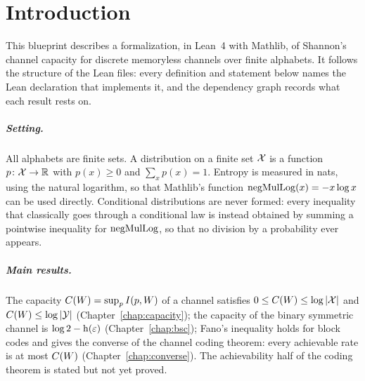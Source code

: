 \chapter{Introduction}

This blueprint describes a formalization, in Lean~4 with Mathlib, of Shannon's channel capacity
for discrete memoryless channels over finite alphabets.  It follows the structure of the Lean
files: every definition and statement below names the Lean declaration that implements it, and
the dependency graph records what each result rests on.

\paragraph{Setting.}
All alphabets are finite sets.  A distribution on a finite set $\mathcal X$ is a function
$p \colon \mathcal X \to \mathbb R$ with $p(x) \ge 0$ and $\sum_x p(x) = 1$.  Entropy is measured in
nats, using the natural logarithm, so that Mathlib's function $\operatorname{negMulLog}(x) = -x \log x$ can be
used directly.  Conditional distributions are never formed: every inequality that classically
goes through a conditional law is instead obtained by summing a pointwise inequality for
$\operatorname{negMulLog}$, so that no division by a probability ever appears.

\paragraph{Main results.}
The capacity $C(W) = \sup_p I(p, W)$ of a channel satisfies $0 \le C(W) \le \log|\mathcal X|$
and $C(W) \le \log|\mathcal Y|$ (Chapter~\ref{chap:capacity}); the capacity of the binary
symmetric channel is $\log 2 - \operatorname{h}(\varepsilon)$ (Chapter~\ref{chap:bsc}); Fano's
inequality holds for block codes and gives the converse of the channel coding theorem: every
achievable rate is at most $C(W)$ (Chapter~\ref{chap:converse}).  The achievability half of the
coding theorem is stated but not yet proved.
